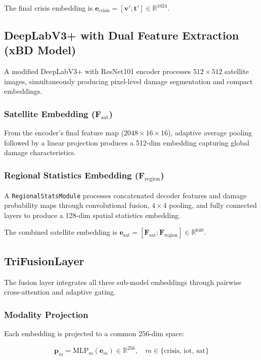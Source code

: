 \documentclass[journal]{IEEEtran}
\begin{document}
The final crisis embedding is $\mathbf{e}_\text{crisis} = [\mathbf{v}'; \mathbf{t}'] \in \mathbb{R}^{1024}$.

\subsection{DeepLabV3+ with Dual Feature Extraction (xBD Model)}

A modified DeepLabV3+ with ResNet101 encoder processes $512 \times 512$ satellite images, simultaneously producing pixel-level damage segmentation and compact embeddings.

\subsubsection{Satellite Embedding ($\mathbf{F}_\text{sat}$)}

From the encoder's final feature map ($2048 \times 16 \times 16$), adaptive average pooling followed by a linear projection produces a 512-dim embedding capturing global damage characteristics.

\subsubsection{Regional Statistics Embedding ($\mathbf{F}_\text{region}$)}

A \texttt{RegionalStatsModule} processes concatenated decoder features and damage probability maps through convolutional fusion, $4 \times 4$ pooling, and fully connected layers to produce a 128-dim spatial statistics embedding.

The combined satellite embedding is $\mathbf{e}_\text{sat} = [\mathbf{F}_\text{sat}; \mathbf{F}_\text{region}] \in \mathbb{R}^{640}$.

\subsection{TriFusionLayer}

The fusion layer integrates all three sub-model embeddings through pairwise cross-attention and adaptive gating.

\subsubsection{Modality Projection}

Each embedding is projected to a common 256-dim space:

\begin{equation}
\mathbf{p}_m = \text{MLP}_m(\mathbf{e}_m) \in \mathbb{R}^{256}, \quad m \in \{\text{crisis, iot, sat}\}
\end{equation}
\end{document}
